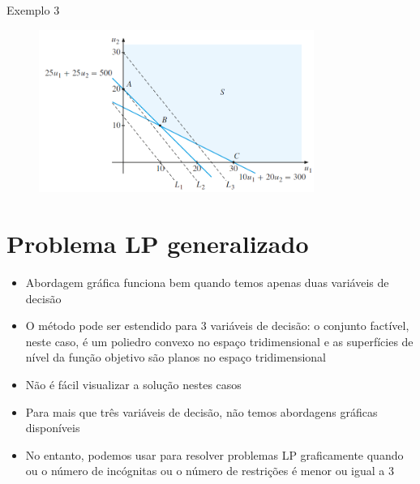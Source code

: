 \documentclass[10pt]{beamer}
\begin{document}
\begin{frame}{Exemplo 3}
    \begin{figure}
        \centering
        \includegraphics[width=0.8\textwidth]{./figures/aula15_fig3.png}        
    \end{figure}
\end{frame}

\section{Problema LP generalizado}
\begin{frame}
    \begin{itemize}
        \item Abordagem gráfica funciona bem quando temos apenas duas variáveis de decisão\bigskip
        \item O método pode ser estendido para 3 variáveis de decisão: o conjunto factível, neste caso, é um poliedro convexo no espaço tridimensional e as superfícies de nível da função objetivo são planos no espaço tridimensional\bigskip
        \item Não é fácil visualizar a solução nestes casos\bigskip
        \item Para mais que três variáveis de decisão, não temos abordagens gráficas disponíveis\bigskip
        \item No entanto, podemos usar  para resolver problemas LP graficamente quando ou o número de incógnitas ou o número de restrições é menor ou igual a 3
    \end{itemize}
\end{frame}
\end{document}
